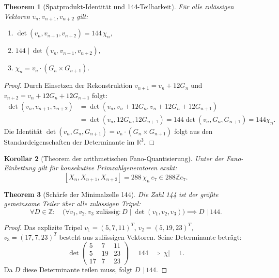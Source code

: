 \documentclass[11pt,a4paper]{article}
\theoremstyle{plain}
\newtheorem{theorem}{Theorem}[section]
\newtheorem{corollary}[theorem]{Korollar}
\theoremstyle{definition}
\theoremstyle{remark}
\begin{document}
\begin{theorem}[Spatprodukt-Identität und 144-Teilbarkeit]
\label{thm:det_144}
Für alle zulässigen Vektoren $v_n, v_{n+1}, v_{n+2}$ gilt:
\begin{enumerate}
    \item $\det(v_n, v_{n+1}, v_{n+2}) = 144 \, \chi_n$,
    \item $144 \mid \det(v_n, v_{n+1}, v_{n+2})$,
    \item $\chi_n = v_n \cdot (G_n \times G_{n+1})$.
\end{enumerate}
\end{theorem}
\begin{proof}
Durch Einsetzen der Rekonstruktion $v_{n+1} = v_n + 12G_n$ und $v_{n+2} = v_n + 12G_n + 12G_{n+1}$ folgt:
\begin{align*}
\det(v_n, v_{n+1}, v_{n+2}) &= \det(v_n, v_n + 12G_n, v_n + 12G_n + 12G_{n+1}) \\
&= \det(v_n, 12G_n, 12G_{n+1}) = 144 \det(v_n, G_n, G_{n+1}) = 144 \chi_n.
\end{align*}
Die Identität $\det(v_n, G_n, G_{n+1}) = v_n \cdot (G_n \times G_{n+1})$ folgt aus den Standardeigenschaften der Determinante im $\mathbb{R}^3$.
\end{proof}

\begin{corollary}[Theorem der arithmetischen Fano-Quantisierung]
Unter der Fano-Einbettung gilt für konsekutive Primzahlgeneratoren exakt:
\begin{equation}
\boxed{[X_n, X_{n+1}, X_{n+2}] = 288 \, \chi_n \, e_7 \in 288\mathbb{Z} e_7.}
\end{equation}
\end{corollary}

\begin{theorem}[Schärfe der Minimalzelle 144]
Die Zahl 144 ist der größte gemeinsame Teiler über alle zulässigen Tripel:
\begin{equation}
\forall D \in \mathbb{Z}: \quad \bigl( \forall v_1, v_2, v_3 \text{ zulässig}: D \mid \det(v_1, v_2, v_3) \bigr) \implies D \mid 144.
\end{equation}
\end{theorem}
\begin{proof}
Das explizite Tripel $v_1 = (5, 7, 11)^T$, $v_2 = (5, 19, 23)^T$, $v_3 = (17, 7, 23)^T$ besteht aus zulässigen Vektoren. Seine Determinante beträgt:
\begin{equation*}
\det \begin{pmatrix} 5 & 7 & 11 \\ 5 & 19 & 23 \\ 17 & 7 & 23 \end{pmatrix} = 144 \implies |\chi| = 1.
\end{equation*}
Da $D$ diese Determinante teilen muss, folgt $D \mid 144$.
\end{proof}
\end{document}
